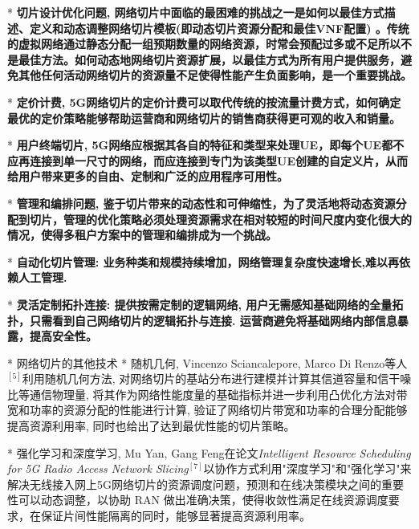     * \bf{切片设计优化问题}, 网络切片中面临的最困难的挑战之一是如何以最佳方式描述、定义和动态调整网络切片模板(即动态切片资源分配和最佳VNF配置) 。传统的虚拟网络通过静态分配一组预期数量的网络资源，时常会预配过多或不足所以不是最佳方法。如何动态地网络切片资源扩展，以最佳方式为所有用户提供服务，避免其他任何活动网络切片的资源量不足使得性能产生负面影响，是一个重要挑战。

    * \bf{定价计费}, 5G网络切片的定价计费可以取代传统的按流量计费方式，如何确定最优的定价策略能够帮助运营商和网络切片的销售商获得更可观的收入和销量。

    * \bf{用户终端切片}, 5G网络应根据其各自的特征和类型来处理UE，即每个UE都不应再连接到单一尺寸的网络，而应连接到专门为该类型UE创建的自定义片，从而给用户带来更多的自由、定制和广泛的应用程序可用性。

    * \bf{管理和编排问题}, 鉴于切片带来的动态性和可伸缩性，为了灵活地将动态资源分配到切片，管理的优化策略必须处理资源需求在相对较短的时间尺度内变化很大的情况，使得多租户方案中的管理和编排成为一个挑战。

    * \bf{自动化切片管理}: 业务种类和规模持续增加，网络管理复杂度快速增长,难以再依赖人工管理.

    * \bf{灵活定制拓扑连接}: 提供按需定制的逻辑网络, 用户无需感知基础网络的全量拓扑，只需看到自己网络切片的逻辑拓扑与连接. 运营商避免将基础网络内部信息暴露，提高安全性。

    
* 网络切片的其他技术
    * 随机几何, Vincenzo Sciancalepore, Marco Di Renzo等人$^{[5]}$利用随机几何方法, 对网络切片的基站分布进行建模并计算其信道容量和信干噪比等通信物理量, 将其作为网络性能度量的基础指标并进一步利用凸优化方法对带宽和功率的资源分配的性能进行计算, 验证了网络切片带宽和功率的合理分配能够提高资源利用率, 同时也给出了达到最优性能的切片策略。
           
    * 强化学习和深度学习, Mu Yan, Gang Feng在论文\textit{Intelligent Resource Scheduling for 5G Radio Access Network Slicing}$^{[7]}$以协作方式利用"深度学习"和"强化学习"来解决无线接入网上5G网络切片的资源调度问题，预测和在线决策模块之间的重要性可以动态调整，以协助 RAN 做出准确决策，使得收敛性满足在线资源调度要求，在保证片间性能隔离的同时，能够显著提高资源利用率。

      
    

